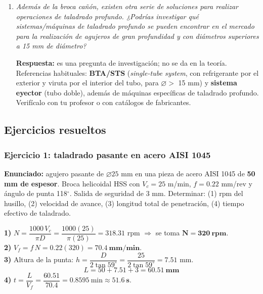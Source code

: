 \documentclass[12pt,a4paper]{article}
\begin{document}
\begin{enumerate}
	      mejor,
	      haciendo una \textbf{interpolación helicoidal} con control numérico.
	      \emph{Ventajas:} una misma fresa sirve para muchos diámetros, se obtiene
	      mejor
	      precisión y se mecanizan agujeros mayores que la herramienta, además de
	      poder
	      hacer agujeros ciegos con fondo plano. \emph{Desventajas:} más lento que
	      una
	      broca, mayor tiempo de programación, y requiere una máquina CNC con
	      interpolación.
	\item \textit{Además de la broca cañón, existen otra serie de soluciones para
		      realizar operaciones de taladrado profundo. ¿Podrías investigar qué
		      sistemas/máquinas de taladrado profundo se pueden encontrar en el
		      mercado para
		      la realización de agujeros de gran profundidad y con diámetros
		      superiores a 15
		      mm de diámetro?}\par
	      \textbf{Respuesta:} es una pregunta de investigación; no se da en la
	      teoría.
	      Referencias habituales: \textbf{BTA/STS} (\emph{single-tube system}, con
	      refrigerante por el exterior y viruta por el interior del tubo, para
	      $\varnothing >$ 15 mm) y \textbf{sistema eyector} (tubo doble), además
	      de
	      máquinas específicas de taladrado profundo. Verifícalo con tu profesor o
	      con
	      catálogos de fabricantes.
\end{enumerate}

\subsection{Ejercicios resueltos}

\subsubsection*{Ejercicio 1: taladrado pasante en acero AISI 1045}
\textbf{Enunciado:} agujero pasante de $\varnothing 25$ mm en una pieza de acero
AISI 1045 de \textbf{50 mm de espesor}. Broca helicoidal HSS con $V_c = 25$
m/min, $f = 0.22$ mm/rev y ángulo de punta 118$^\circ$. Salida de seguridad de 3
mm. Determinar: (1) rpm del husillo, (2) velocidad de avance, (3) longitud total
de penetración, (4) tiempo efectivo de taladrado.

\textbf{1)} $N = \dfrac{1000\,V_c}{\pi D} = \dfrac{1000(25)}{\pi(25)} = 318.31$
rpm $\Rightarrow$ se toma $\mathbf{N = 320\ rpm}$.\\
\textbf{2)} $V_f = f\,N = 0.22(320) = \mathbf{70.4\ mm/min}$.\\
\textbf{3)} Altura de la punta: $h = \dfrac{D}{2\tan 59^\circ} =
	\dfrac{25}{2\tan 59^\circ} = 7.51$ mm. \[ L = 50 + 7.51 + 3 = \mathbf{60.51\
		mm}
\]
\textbf{4)} $t = \dfrac{L}{V_f} = \dfrac{60.51}{70.4} = 0.8595\ \text{min}
	\approx \mathbf{51.6\ s}$.
\end{document}
